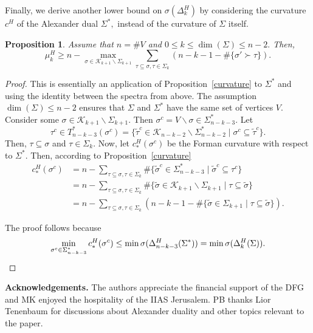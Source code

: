 \documentclass[10pt]{amsart}
\newtheorem{proposition}[theorem]{Proposition}
\theoremstyle{definition}
\newcommand{\K}{\mathcal{K}}
\begin{document}
Finally, we derive another lower bound on $\sigma(\Delta_k^H)$ by considering the curvature $c^H$ of the Alexander dual $\Sigma^*,$ instead of the curvature of $\Sigma$ itself.
\begin{proposition}
   Assume that $n = \#V$ and $0\leq k\leq\dim(\Sigma)\leq n-2.$ Then,
    \[\mu^H_k\geq n-\max_{\sigma\in \K_{k+1}\backslash\Sigma_{k+1}}\sum_{\tau\subseteq\sigma,\tau\in\Sigma_k}\left(n-k-1-\#\lbrace\sigma'\succ\tau\rbrace\right).\]
\end{proposition}
\begin{proof}
    This is essentially an application of Proposition~\ref{curvature} to $\Sigma^*$ and using the identity between the spectra from above. The assumption $\dim(\Sigma)\leq n-2$ ensures that $\Sigma$ and $\Sigma^*$ have the same set of vertices $V.$\\
    Consider some $\sigma\in \K_{k+1}\backslash\Sigma_{k+1}.$ Then $\sigma^c = V\backslash\sigma\in\Sigma^*_{n-k-3}.$ Let 
    \[\tau^c\in T^*_{n-k-3}(\sigma^c) = \lbrace\tilde\tau^c\in \K_{n-k-2}\backslash\Sigma^*_{n-k-2}\mid\sigma^c\subseteq\tilde\tau^c\rbrace. \]
    Then, $\tau\subseteq\sigma$ and $\tau\in\Sigma_k.$
    Now, let $c^H_*(\sigma^c)$ be the Forman curvature with respect to $\Sigma^*.$ Then, according to Proposition~\ref{curvature}
\begin{align*}
    c^H_*(\sigma^c) &= n-\sum_{\tau\subseteq\sigma,
\tau\in\Sigma_k}\#\lbrace\tilde\sigma^c\in\Sigma^*_{n-k-3}\mid\tilde\sigma^c\subseteq\tau^c\rbrace \\
&= n-\sum_{\tau\subseteq\sigma,\tau\in\Sigma_k}\#\lbrace\tilde\sigma\in \K_{k+1}\backslash\Sigma_{k+1}\mid\tau\subseteq\tilde\sigma\rbrace\\
& = n-\sum_{\tau\subseteq\sigma,\tau\in\Sigma_k}(n-k-1-\#\lbrace\tilde\sigma\in\Sigma_{k+1}\mid\tau\subseteq\tilde\sigma\rbrace).
\end{align*}

The proof follows because \[\min_{\sigma^c\in\Sigma^*_{n-k-3}}c^H_*(\sigma^c)\leq\min\sigma(\Delta^H_{n-k-3}(\Sigma^*)) = \min\sigma(\Delta^H_k(\Sigma)).\hfill\qedhere\]
\end{proof}
\textbf{Acknowledgements.} The authors appreciate the financial support of the DFG and MK enjoyed the hospitality of the IIAS Jerusalem. PB thanks Lior Tenenbaum for discussions about Alexander duality and other topics relevant to the paper.



\end{document}
